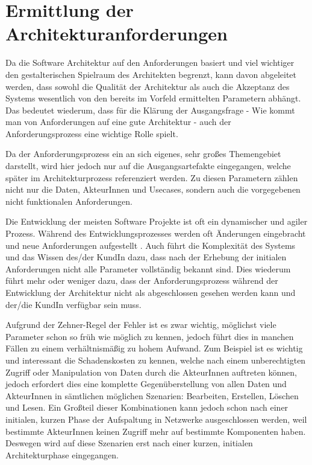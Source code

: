 \chapter{Ermittlung der Architekturanforderungen}
Da die Software Architektur auf den Anforderungen basiert und viel wichtiger \glqq den gestalterischen Spielraum des Architekten\grqq \cite[S. 103]{softarch} begrenzt, kann davon abgeleitet werden, dass sowohl die Qualität der Architektur als auch die Akzeptanz des Systems wesentlich von den bereits im Vorfeld ermittelten Parametern abhängt. Das bedeutet wiederum, dass für die Klärung der Ausgangsfrage - Wie kommt man von Anforderungen auf eine gute Architektur - auch der Anforderungsprozess eine wichtige Rolle spielt.

Da der Anforderungsprozess ein an sich eigenes, sehr großes Themengebiet darstellt, wird hier jedoch nur auf die Ausgangsartefakte eingegangen, welche später im Architekturprozess referenziert werden. Zu diesen Parametern zählen nicht nur die Daten, AkteurInnen und Usecases, sondern auch die vorgegebenen nicht funktionalen Anforderungen.

Die Entwicklung der meisten Software Projekte ist oft ein dynamischer und agiler Prozess. Während des Entwicklungsprozesses werden oft Änderungen eingebracht und neue Anforderungen aufgestellt  \cite[S. 6-7, S. 37]{effektiv}. Auch führt die Komplexität des Systems und das Wissen des/der KundIn dazu, dass nach der Erhebung der initialen Anforderungen nicht alle Parameter vollständig bekannt sind. Dies wiederum führt mehr oder weniger dazu, dass der Anforderungsprozess während der Entwicklung der Architektur nicht als abgeschlossen gesehen werden kann und der/die KundIn verfügbar sein muss.

Aufgrund der Zehner-Regel der Fehler \cite[S. 154]{fehler} ist es zwar wichtig, möglichst viele Parameter schon so früh wie möglich zu kennen, jedoch führt dies in manchen Fällen zu einem verhältnismäßig zu hohem Aufwand. Zum Beispiel ist es wichtig und interessant die Schadenskosten zu kennen, welche nach einem unberechtigten Zugriff oder Manipulation von Daten durch die AkteurInnen auftreten können, jedoch erfordert dies eine komplette Gegenüberstellung von allen Daten und AkteurInnen in sämtlichen möglichen Szenarien: Bearbeiten, Erstellen, Löschen und Lesen. Ein Großteil dieser Kombinationen kann jedoch schon nach einer initialen, kurzen Phase der Aufspaltung in Netzwerke ausgeschlossen werden, weil bestimmte AkteurInnen keinen Zugriff mehr auf bestimmte Komponenten haben. Deswegen wird auf diese Szenarien erst nach einer kurzen, initialen Architekturphase eingegangen.

